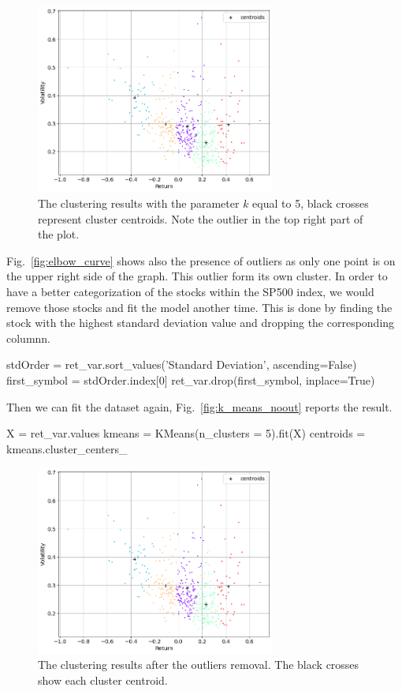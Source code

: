 \begin{figure}
\centering
\includegraphics[width=0.7\textwidth]{figures/k_means_5}
\caption{The clustering results with the parameter $k$ equal to 5, black crosses represent cluster centroids. Note the outlier in the top right part of the plot.}
\label{fig:K_means_5}
\end{figure}
 
Fig.~\ref{fig:elbow_curve} shows also the presence of outliers as only one point is on the upper right side of the graph. This outlier form its own cluster. In order to have a better categorization of the stocks within the SP500 index, we would remove those stocks and fit the model another time.
This is done by finding the stock with the highest standard deviation value and dropping the corresponding columnn.
 
\begin{ipython}
stdOrder = ret_var.sort_values('Standard Deviation', ascending=False)
first_symbol = stdOrder.index[0]
ret_var.drop(first_symbol, inplace=True)
\end{ipython}
Then we can fit the dataset again, Fig.~\ref{fig:k_means_noout} reports the result.

\begin{ipython}
X = ret_var.values
kmeans = KMeans(n_clusters = 5).fit(X)
centroids = kmeans.cluster_centers_
\end{ipython}
 
\begin{figure}
\centering
\includegraphics[width=0.7\textwidth]{figures/k_means_noout}
\caption{The clustering results after the outliers removal. The black crosses show each cluster centroid.}
\label{fig:K_means_noout}
\end{figure}
  
